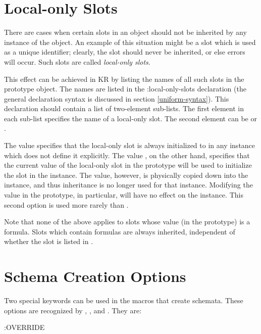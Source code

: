 \section{Local-only Slots}
\value{s-top}

\label{local-only}
There are cases when certain slots in an object should not be inherited by
any instance of the object.  An example of this situation might be a slot
which is used as a unique identifier; clearly, the slot should never be
inherited, or else errors will occur.  Such slots are called {\it local-only
slots}.

This effect can be achieved in KR by listing the names of all such slots in
the prototype object.  The names are listed in the {\sc :local-only-slots}
declaration (the general declaration syntax is discussed in section
\ref{uniform-syntax}).  This declaration should contain a list of two-element
sub-lists.  The first element in each sub-list specifies the name of a
local-only slot.  The second element can be \value{T} or \value{NIL}.

The value \value{NIL} specifies that the local-only slot is always
initialized to \value{NIL} in any instance which does not define it
explicitly.  The value \value{T}, on the other hand, specifies that the
current value of the local-only slot in the prototype will be used to
initialize the slot in the instance.  The value, however, is physically copied
down into the instance, and thus inheritance is no longer used for that
instance. Modifying the value in the prototype, in particular, will have no
effect on the instance.  This second option is used more rarely than
\value{NIL}.

Note that none of the above applies to slots whose value (in the prototype) is
a formula.  Slots which contain formulas are always inherited, independent
of whether the slot is listed in .



\section{Schema Creation Options}
\value{s-top}

Two special keywords can be used in the macros that create schemata.  These
options are recognized by , , and
.  They are\label{create-options}:

\value{f-top}
\begin{example}
:OVERRIDE\value{keyword}\end{example}

